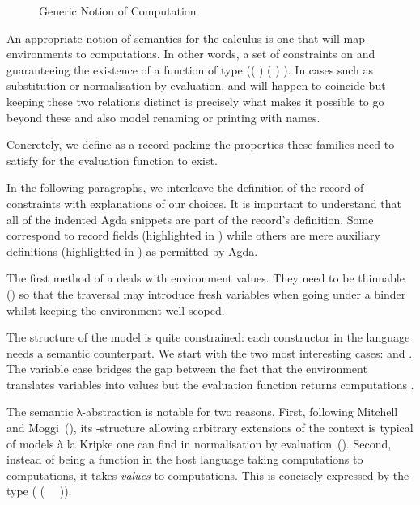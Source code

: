 \begin{figure}[h]
\caption{Generic Notion of Computation\label{fig:comp}}
\end{figure}

An appropriate notion of semantics for the calculus is one that will
map environments to computations. In other words, a set of constraints on
 and  guaranteeing the existence of a function of type
(( )    ( )  ).
In cases such as substitution or normalisation by evaluation,
 and  will happen to coincide but keeping these two relations
distinct is precisely what makes it possible to go beyond these and
also model renaming or printing with names.

Concretely, we define  as a record packing the properties
these families need to satisfy for the evaluation function to exist.


In the following paragraphs, we interleave the definition of the record
of constraints \semrec{} with explanations of our choices. It is important
to understand that all of the indented Agda snippets are part of the record's
definition. Some correspond to record fields (highlighted in )
while others are mere auxiliary definitions (highlighted in ) as
permitted by Agda.

The first method of a  deals with environment values. They
need to be thinnable () so that the traversal
may introduce fresh variables when going under a binder whilst keeping
the environment well-scoped.

{
\addtolength{\leftskip}{\parindent}
}

The structure of the model is quite constrained: each constructor
in the language needs a semantic counterpart. We start with the
two most interesting cases:  and . The variable
case bridges the gap between the fact that the environment translates
variables into values  but the evaluation function returns
computations .

{
\addtolength{\leftskip}{\parindent}
}

The semantic λ-abstraction is notable for two reasons.
%
First, following Mitchell and Moggi~(\citeyear{mitchell1991kripke}),
its -structure allowing arbitrary extensions of the context is typical
of models à la Kripke  one can find in normalisation by
evaluation~(\cite{berger1991inverse,berger1993program,CoqDybSK,coquand2002formalised}).
%
Second, instead of being a function in the host language taking
computations to computations,  it takes \emph{values} to computations.
This is concisely expressed by the type ({ (~  ~)}).

